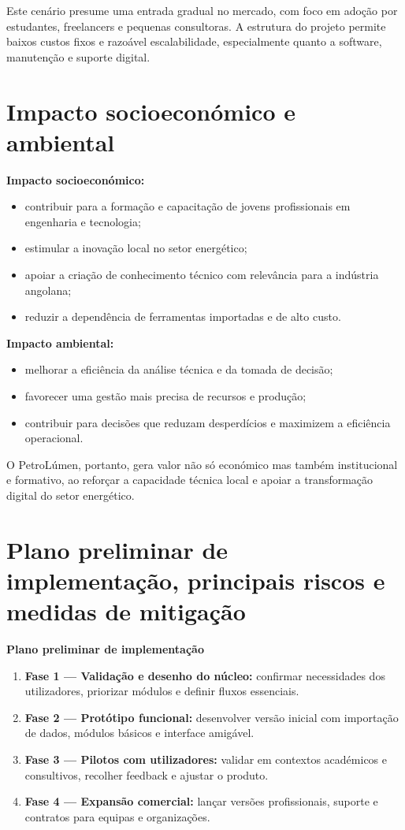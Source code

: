 \documentclass[11pt,a4paper]{article}
\begin{document}
Este cenário presume uma entrada gradual no mercado, com foco em adoção por estudantes, freelancers e pequenas consultoras. A estrutura do projeto permite baixos custos fixos e razoável escalabilidade, especialmente quanto a software, manutenção e suporte digital.

\section{Impacto socioeconómico e ambiental}
\textbf{Impacto socioeconómico:}
\begin{itemize}
    \item contribuir para a formação e capacitação de jovens profissionais em engenharia e tecnologia;
    \item estimular a inovação local no setor energético;
    \item apoiar a criação de conhecimento técnico com relevância para a indústria angolana;
    \item reduzir a dependência de ferramentas importadas e de alto custo.
\end{itemize}

\textbf{Impacto ambiental:}
\begin{itemize}
    \item melhorar a eficiência da análise técnica e da tomada de decisão;
    \item favorecer uma gestão mais precisa de recursos e produção;
    \item contribuir para decisões que reduzam desperdícios e maximizem a eficiência operacional.
\end{itemize}

O PetroLúmen, portanto, gera valor não só económico mas também institucional e formativo, ao reforçar a capacidade técnica local e apoiar a transformação digital do setor energético.

\section{Plano preliminar de implementação, principais riscos e medidas de mitigação}
\textbf{Plano preliminar de implementação}
\begin{enumerate}
    \item \textbf{Fase 1 — Validação e desenho do núcleo:} confirmar necessidades dos utilizadores, priorizar módulos e definir fluxos essenciais.
    \item \textbf{Fase 2 — Protótipo funcional:} desenvolver versão inicial com importação de dados, módulos básicos e interface amigável.
    \item \textbf{Fase 3 — Pilotos com utilizadores:} validar em contextos académicos e consultivos, recolher feedback e ajustar o produto.
    \item \textbf{Fase 4 — Expansão comercial:} lançar versões profissionais, suporte e contratos para equipas e organizações.
\end{enumerate}
\end{document}
